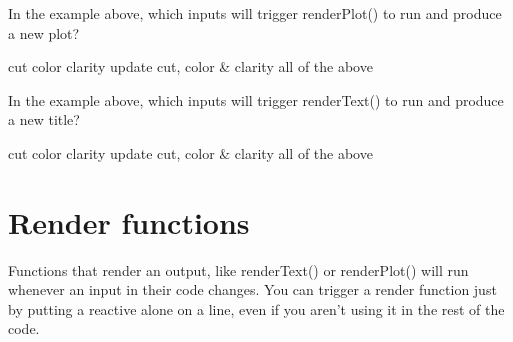 \documentclass[
]{book}
\newenvironment{Shaded}{\begin{snugshade}}{\end{snugshade}}
\newcommand{\AttributeTok}[1]{\textcolor[rgb]{0.77,0.63,0.00}{#1}}
\newcommand{\CommentTok}[1]{\textcolor[rgb]{0.56,0.35,0.01}{\textit{#1}}}
\newcommand{\ControlFlowTok}[1]{\textcolor[rgb]{0.13,0.29,0.53}{\textbf{#1}}}
\newcommand{\ErrorTok}[1]{\textcolor[rgb]{0.64,0.00,0.00}{\textbf{#1}}}
\newcommand{\FloatTok}[1]{\textcolor[rgb]{0.00,0.00,0.81}{#1}}
\newcommand{\FunctionTok}[1]{\textcolor[rgb]{0.00,0.00,0.00}{#1}}
\newcommand{\NormalTok}[1]{#1}
\newcommand{\OtherTok}[1]{\textcolor[rgb]{0.56,0.35,0.01}{#1}}
\newcommand{\SpecialCharTok}[1]{\textcolor[rgb]{0.00,0.00,0.00}{#1}}
\newcommand{\StringTok}[1]{\textcolor[rgb]{0.31,0.60,0.02}{#1}}
\begin{document}
In the example above, which inputs will trigger renderPlot() to run and produce a new plot?

cut color clarity update cut, color \& clarity all of the above

In the example above, which inputs will trigger renderText() to run and produce a new title?

cut color clarity update cut, color \& clarity all of the above

\hypertarget{render-functions}{%
\section{Render functions}\label{render-functions}}

Functions that render an output, like renderText() or renderPlot() will run whenever an input in their code changes. You can trigger a render function just by putting a reactive alone on a line, even if you aren't using it in the rest of the code.

\begin{Shaded}
\end{Shaded}
\end{document}
